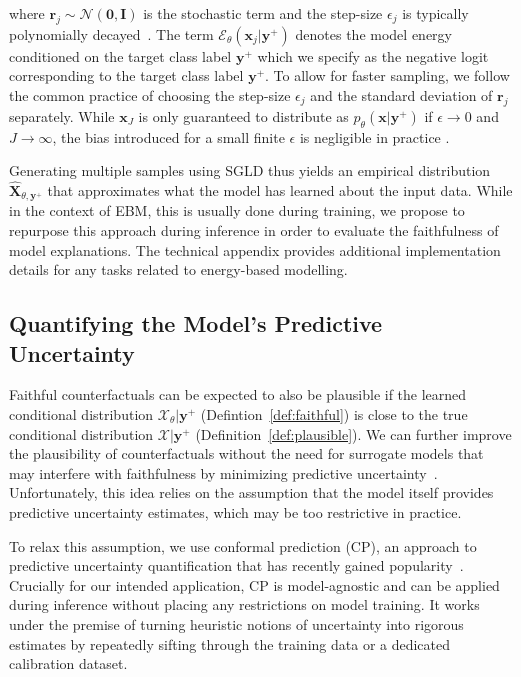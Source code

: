 where $\mathbf{r}_j \sim \mathcal{N}(\mathbf{0},\mathbf{I})$ is the stochastic term and the step-size $\epsilon_j$ is typically polynomially decayed~\citep{welling2011bayesian}. The term $\mathcal{E}_{\theta}(\mathbf{x}_j|\mathbf{y}^+)$ denotes the model energy conditioned on the target class label $\mathbf{y}^+$ which we specify as the negative logit corresponding to the target class label $\mathbf{y}^{+}$. To allow for faster sampling, we follow the common practice of choosing the step-size $\epsilon_j$ and the standard deviation of $\mathbf{r}_j$ separately. While $\mathbf{x}_J$ is only guaranteed to distribute as $p_{\theta}(\mathbf{x}|\mathbf{y}^{+})$ if $\epsilon \rightarrow 0$ and $J \rightarrow \infty$, the bias introduced for a small finite $\epsilon$ is negligible in practice \citep{murphy2023probabilistic}. 

Generating multiple samples using SGLD thus yields an empirical distribution $\widehat{\mathbf{X}}_{\theta,\mathbf{y}^+}$ that approximates what the model has learned about the input data. While in the context of EBM, this is usually done during training, we propose to repurpose this approach during inference in order to evaluate the faithfulness of model explanations. The technical appendix provides additional implementation details for any tasks related to energy-based modelling. 

\subsection{Quantifying the Model's Predictive Uncertainty}

Faithful counterfactuals can be expected to also be plausible if the learned conditional distribution $\mathcal{X}_{\theta}|\mathbf{y}^+$ (Defintion~\ref{def:faithful}) is close to the true conditional distribution $\mathcal{X}|\mathbf{y}^+$ (Definition~\ref{def:plausible}). We can further improve the plausibility of counterfactuals without the need for surrogate models that may interfere with faithfulness by minimizing predictive uncertainty~\citep{schut2021generating}.
Unfortunately, this idea relies on the assumption that the model itself provides predictive uncertainty estimates, which may be too restrictive in practice. 

To relax this assumption, we use conformal prediction (CP), an approach to predictive uncertainty quantification that has recently gained popularity~\citep{angelopoulos2021gentle,manokhin2022awesome}. Crucially for our intended application, CP is model-agnostic and can be applied during inference without placing any restrictions on model training. It works under the premise of turning heuristic notions of uncertainty into rigorous estimates by repeatedly sifting through the training data or a dedicated calibration dataset. 


